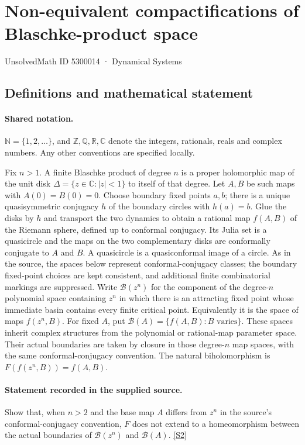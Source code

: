 \documentclass[11pt]{article}
\newcommand{\sref}[2]{\hyperlink{source:#1:#2}{[S#2]}}
\begin{document}
\setcounter{section}{5300013}
\section{Non-equivalent compactifications of Blaschke-product space}\label{5300014}
{\small\sffamily UnsolvedMath ID 5300014 · Dynamical Systems}
\subsection{Definitions and mathematical statement}

\paragraph{Shared notation.}$\mathbb N=\{1,2,\ldots\}$, and $\mathbb Z,\mathbb Q,\mathbb R,\mathbb C$ denote the integers, rationals, reals and complex numbers. Any other conventions are specified locally.


Fix $n>1$. A finite Blaschke product of degree $n$ is a proper holomorphic map of the unit disk $\Delta=\{z\in\mathbb C:|z|<1\}$ to itself of that degree. Let $A,B$ be such maps with $A(0)=B(0)=0$. Choose boundary fixed points $a,b$; there is a unique quasisymmetric conjugacy $h$ of the boundary circles with $h(a)=b$. Glue the disks by $h$ and transport the two dynamics to obtain a rational map $f(A,B)$ of the Riemann sphere, defined up to conformal conjugacy. Its Julia set is a quasicircle and the maps on the two complementary disks are conformally conjugate to $A$ and $B$. A quasicircle is a quasiconformal image of a circle. As in the source, the spaces below represent conformal-conjugacy classes; the boundary fixed-point choices are kept consistent, and additional finite combinatorial markings are suppressed.
Write $\mathcal B(z^n)$ for the component of the degree-$n$ polynomial space containing $z^n$ in which there is an attracting fixed point whose immediate basin contains every finite critical point. Equivalently it is the space of maps $f(z^n,B)$. For fixed $A$, put $\mathcal B(A)=\{f(A,B):B\text{ varies}\}$. These spaces inherit complex structures from the polynomial or rational-map parameter space. Their actual boundaries are taken by closure in those degree-$n$ map spaces, with the same conformal-conjugacy convention. The natural biholomorphism is $F(f(z^n,B))=f(A,B)$.
\paragraph{Statement recorded in the supplied source.}
Show that, when $n>2$ and the base map $A$ differs from $z^n$ in the source's conformal-conjugacy convention, $F$ does not extend to a homeomorphism between the actual boundaries of $\mathcal B(z^n)$ and $\mathcal B(A)$. \sref{5300014}{2}
\end{document}
